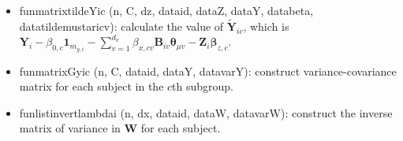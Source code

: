 \documentclass[useAMS,usenatbib,referee]{article}
\def\wt{\widetilde}
\newcommand{\BZ}{{\pmb Z}}
\newcommand{\BY}{{\pmb Y}}
\newcommand{\BW}{{\pmb W}}
\newcommand{\BB}{{\pmb B}}
\newcommand{\Bone}{\pmb 1}
\newcommand{\Bbeta}{{\pmb \beta}}
\newcommand{\Bthe}{{\pmb \theta}}
\def\wt{\widetilde}
\begin{document}
\begin{itemize}
     \item fun\textunderscore matrix\textunderscore tilde\textunderscore Y\textunderscore ic (n, C, dz, data\textunderscore id, data\textunderscore Z, data\textunderscore Y, data\textunderscore beta, data\textunderscore tilde\textunderscore mu\textunderscore star\textunderscore ic\textunderscore v): calculate the value of $\wt{\BY}_{ic}$, which is $\BY_{i} -\beta_{0,c} \Bone_{m_{y,i}} -\sum_{v=1}^{d_x} \beta_{x,cv} \BB_{iv} \Bthe_{\mu v}-\BZ_i \Bbeta_{z,c} $.
    \item fun\textunderscore matrix\textunderscore G\textunderscore y\textunderscore ic (n, C, data\textunderscore id, data\textunderscore Y, data\textunderscore var\textunderscore Y): construct variance-covariance matrix for each subject in the $c$th subgroup.
    \item  fun\textunderscore list\textunderscore invert\textunderscore lambda\textunderscore i (n, dx, data\textunderscore id, data\textunderscore W, data\textunderscore var\textunderscore W): construct the inverse matrix of variance in $\BW$ for each subject.
\end{itemize}
\end{document}
